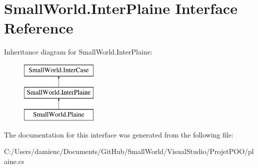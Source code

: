 \hypertarget{interface_small_world_1_1_inter_plaine}{\section{Small\-World.\-Inter\-Plaine Interface Reference}
\label{interface_small_world_1_1_inter_plaine}
}
Inheritance diagram for Small\-World.\-Inter\-Plaine\-:\begin{figure}[H]
\begin{center}
\leavevmode
\includegraphics[height=3.000000cm]{interface_small_world_1_1_inter_plaine}
\end{center}
\end{figure}


The documentation for this interface was generated from the following file\-:\begin{DoxyCompactItemize}
\item 
C\-:/\-Users/damienc/\-Documents/\-Git\-Hub/\-Small\-World/\-Visual\-Studio/\-Projet\-P\-O\-O/plaine.\-cs\end{DoxyCompactItemize}
